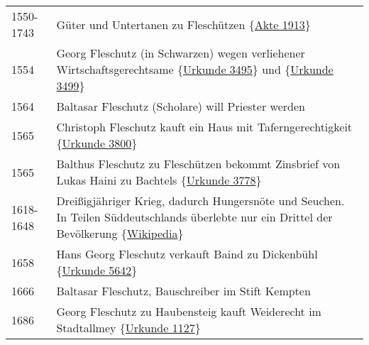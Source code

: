 \documentclass[
]{article}
\begin{document}
\begin{longtable}[]{@{}ll@{}}
1550-1743 & Güter und Untertanen zu Fleschützen
\{\href{Quellen/Fuerststift_Kempten/Akte_1913}{Akte 1913}\} \\
1554 & Georg Fleschutz (in Schwarzen) wegen verliehener
Wirtschaftsgerechtsame
\{\href{Quellen/Fuerststift_Kempten/Urkunde_3495/}{Urkunde 3495}\} und
\{\href{Quellen/Fuerststift_Kempten/Urkunde_3499}{Urkunde 3499}\} \\
1564 & Baltasar Fleschutz (Scholare) will Priester werden \\
1565 & Christoph Fleschutz kauft ein Haus mit Taferngerechtigkeit
\{\href{Quellen/Fuerststift_Kempten/Urkunde_3800}{Urkunde 3800}\} \\
1565 & Balthus Fleschutz zu Fleschützen bekommt Zinsbrief von Lukas
Haini zu Bachtels
\{\href{Quellen/Fuerststift_Kempten/Urkunde_3778}{Urkunde 3778}\} \\
1618-1648 & Dreißigjähriger Krieg, dadurch Hungersnöte und Seuchen. In
Teilen Süddeutschlands überlebte nur ein Drittel der Bevölkerung
\{\href{Quellen/Wikipedia/Dreissigjaehriger_Krieg}{Wikipedia}\} \\
1658 & Hans Georg Fleschutz verkauft Baind zu Dickenbühl
\{\href{Quellen/Fuerststift_Kempten/Urkunde_5642/}{Urkunde 5642}\} \\
1666 & Baltasar Fleschutz, Bauschreiber im Stift Kempten \\
1686 & Georg Fleschutz zu Haubensteig kauft Weiderecht im Stadtallmey
\{\href{Quellen/Fuerststift_Kempten/Urkunde_1127/}{Urkunde 1127}\} \\
\end{longtable}
\end{document}
